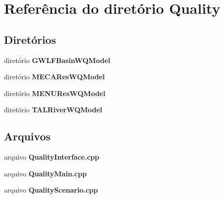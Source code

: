 \section{Referência do diretório Quality}
\label{dir_ded7b9239d7a1dde2ef2bc941f290fc1}
\subsection*{Diretórios}
\begin{DoxyCompactItemize}
\item 
diretório {\bf G\+W\+L\+F\+Basin\+W\+Q\+Model}
\item 
diretório {\bf M\+E\+C\+A\+Res\+W\+Q\+Model}
\item 
diretório {\bf M\+E\+N\+U\+Res\+W\+Q\+Model}
\item 
diretório {\bf T\+A\+L\+River\+W\+Q\+Model}
\end{DoxyCompactItemize}
\subsection*{Arquivos}
\begin{DoxyCompactItemize}
\item 
arquivo {\bf Quality\+Interface.\+cpp}
\item 
arquivo {\bf Quality\+Main.\+cpp}
\item 
arquivo {\bf Quality\+Scenario.\+cpp}
\end{DoxyCompactItemize}
